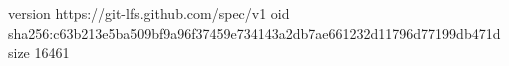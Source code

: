 version https://git-lfs.github.com/spec/v1
oid sha256:c63b213e5ba509bf9a96f37459e734143a2db7ae661232d11796d77199db471d
size 16461
